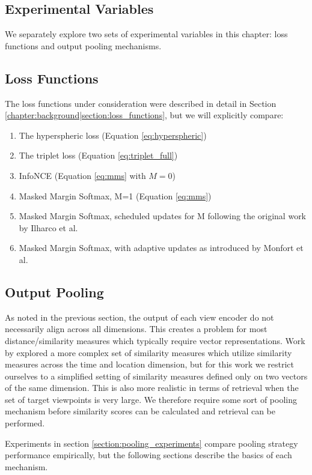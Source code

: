 \subsection{Experimental Variables}
We separately  explore two sets of experimental variables in this chapter: loss functions and output pooling mechanisms.
\subsection{Loss Functions}
The loss functions under consideration were described in detail in Section \ref{chapter:background|section:loss_functions}, but we will explicitly compare:
\begin{enumerate}
    \item The hyperspheric loss (Equation \ref{eq:hyperspheric})
    \item The triplet loss (Equation \ref{eq:triplet_full})
    \item InfoNCE (Equation \ref{eq:mms} with $M=0$)
    \item Masked Margin Softmax, M=1 (Equation \ref{eq:mms})
    \item Masked Margin Softmax, scheduled updates for M following the original work by Ilharco et al. \cite{ilharco2019large}
    \item Masked Margin Softmax, with adaptive updates as introduced by Monfort et al. \cite{monfort2021spoken}

\end{enumerate}
\subsection{Output Pooling}
\label{section:output_pooling}
As noted in the previous section, the output of each view encoder do not necessarily align across all dimensions. 
This creates a problem for most distance/similarity measures which typically require vector representations.
Work by \cite{harwath2018jointly} explored a more complex set of similarity measures which utilize similarity measures across the time and location dimension, but for this work we restrict ourselves to a simplified setting of similarity measures defined only on two vectors of the same dimension.
This is also more realistic in terms of retrieval when the set of target viewpoints is very large.
We therefore require some sort of pooling mechanism before similarity scores can be calculated and retrieval can be performed.


Experiments in section \ref{section:pooling_experiments} compare pooling strategy performance empirically, but the following sections describe the basics of each mechanism.

